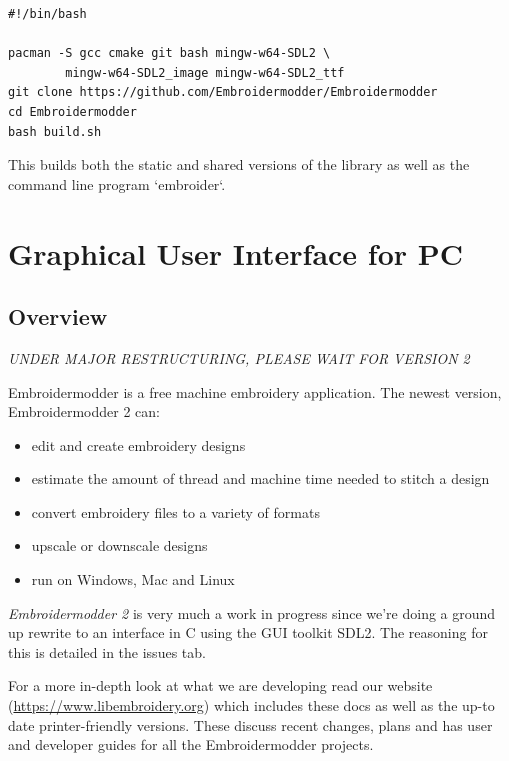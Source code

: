 \documentclass[11pt]{report}
\begin{document}
\begin{lstlisting}
#!/bin/bash

pacman -S gcc cmake git bash mingw-w64-SDL2 \
        mingw-w64-SDL2_image mingw-w64-SDL2_ttf
git clone https://github.com/Embroidermodder/Embroidermodder
cd Embroidermodder
bash build.sh
\end{lstlisting}

This builds both the static and shared versions of the library as well
as the command line program `embroider`.

\citep{packard1992pcl}
\citep{linuxcncsrc}
\citep{linuxcnc}
\citep{adobe1990postscript}
\citep{postscript1999postscript}
\citep{eduTechDST}
\citep{cups}
\citep{millOperatorsManual}
\citep{oberg1914machinery}
\citep{dxf_reference}
\citep{embroidermodder_source_code}
\citep{libembroidery_source_code}
\citep{acatina}
\citep{kde_tajima}
\citep{wotsit_archive}
\citep{wotsit_siterip}
\citep{fineemb_dst}
\citep{edutechwiki_dst}

\section{Graphical User Interface for PC}
\label{GUI}

\subsection{Overview}

\emph{UNDER MAJOR RESTRUCTURING, PLEASE WAIT FOR VERSION 2}

Embroidermodder is a free machine embroidery application.
The newest version, Embroidermodder 2 can:

\begin{itemize}
\item edit and create embroidery designs
\item estimate the amount of thread and machine time needed to stitch a design
\item convert embroidery files to a variety of formats
\item upscale or downscale designs
\item run on Windows, Mac and Linux
\end{itemize}

\emph{Embroidermodder 2} is very much a work in progress since we're doing a ground
up rewrite to an interface in C using the GUI toolkit SDL2.
The reasoning for this is detailed in the issues tab.

For a more in-depth look at what we are developing read our
website (\url{https://www.libembroidery.org}) which includes these docs as well
as the up-to date printer-friendly versions. These discuss recent changes,
plans and has user and developer guides for all the Embroidermodder projects.
\end{document}
